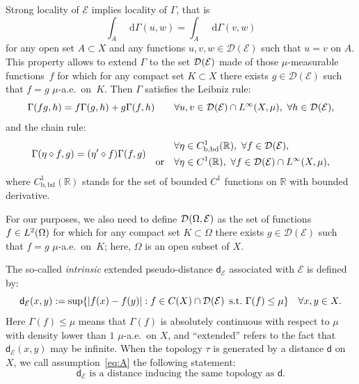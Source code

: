 \documentclass[JEP,XML,SOM,Unicode,published]{cedram}
\let\sep:
\newcommand{\NoChangel}[1]{%
\expandafter\let\csname old\string#1\endcsname=#1
\let#1=\relax
\newcommand{#1}{\mathcode`l="716C\csname old\string#1\endcsname\mathcode`l="7160 }%
}
\theoremstyle{plain}
\theoremstyle{definition}
\newcommand{\setR}{\mathbb{R}}
\newcommand{\cE}{\mathcal{E}}
\newcommand{\cD}{\mathcal{D}}
\newcommand{\di}{\mathop{}\!\mathrm{d}}
\newcommand{\loc}{\mathrm{loc}}\NoChangel{\loc}
\newcommand{\dist}{\mathsf{d}}
\begin{document}
Strong locality of $\cE$ implies locality of $\Gamma$, that is
\[
\int_A \di \Gamma(u,w) = \int_A \di \Gamma(v,w)
\]
for any open set $A\subset X$ and any functions $u,v,w \in \cD(\cE)$ such that $u=v$ on $A$. This property allows to extend $\Gamma$ to the set $\cD_{\loc}(\cE)$ made of those $\mu$-measurable functions~$f$ for which for any compact set $K\subset X$ there exists $g \in \cD(\cE)$ such that $f=g$ $\mu$-a.e.\ on~$K$. Then $\Gamma$ satisfies the Leibniz rule:
\begin{equation}\label{eq:Leibniz}
\Gamma(fg,h)=f \Gamma(g,h) + g \Gamma(f,h) \qquad \forall u,v \in \cD_{\loc}(\cE) \cap L^{\infty}_{\loc}(X,\mu), \, \, \forall h \in \cD_{\loc}(\cE),
\end{equation}
and the chain rule:
\begin{equation}
\Gamma(\eta \circ f,g)=(\eta'\circ f) \Gamma(f,g)\quad
\begin{aligned}\label{eq:chain}
& \forall \eta \in C^1_\mathrm{b,bd}(\setR), \, \, \forall f \in \cD_{\loc}(\cE), \\
\text{or} \quad & \forall \eta \in C^1(\setR), \, \, \forall f \in \cD_{\loc}(\cE)\cap L^{\infty}(X,\mu),
\end{aligned}
\end{equation}
where $C^1_\mathrm{b,bd}(\setR)$ stands for the set of bounded $C^1$ functions on $\setR$ with bounded derivative.

For our purposes, we also need to define $\cD_{\loc}(\Omega,\cE)$ as the set of functions $f\in L^2_{\loc}(\Omega)$ for which for any compact set $K\subset \Omega$ there exists $g \in \cD(\cE)$ such that $f=g$ $\mu$-a.e.\ on~$K$; here, $\Omega$ is an open subset of $X$.

The so-called \textit{intrinsic} extended pseudo-distance $\dist_\cE$ associated with $\cE$ is defined by:
\begin{equation}\label{eq:defdist}
\dist_\cE(x,y):=\sup \{|f(x)-f(y)| \sep f \in C(X) \cap \cD_{\loc}(\cE) \, \, \, \text{s.t.} \, \, \Gamma(f) \le \mu\}\quad \forall x,y \in X.
\end{equation}
Here $\Gamma(f) \le \mu$ means that $\Gamma(f)$ is absolutely continuous with respect to $\mu$ with density lower than $1$ $\mu$-a.e.\ on $X$, and ``extended'' refers to the fact that $\dist_\cE(x,y)$ may be infinite. When the topology $\tau$ is generated by a distance $\dist$ on $X$, we call assumption~\eqref{eq:A} the following statement:
\begin{equation}\label{eq:A}\tag{A}
\text{$\dist_\cE$ is a distance inducing the same topology as $\dist$}.
\end{equation}
\end{document}
